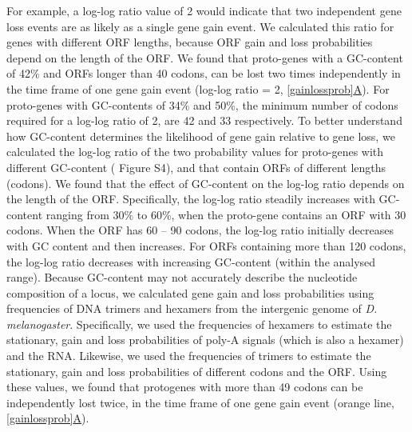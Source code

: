 \documentclass[12pt,a4paper]{article}
\newcommand{\cmnt}[1]{{\color{purple} #1}}
\begin{document}
For example, a log-log ratio value of 2 would indicate that two independent gene loss events are as likely as a single gene gain event. We calculated this ratio for genes with different ORF lengths, because ORF gain and loss probabilities depend on the length of the ORF. We found that proto-genes with a GC-content of 42\% and ORFs longer than 40 codons, can be lost two times independently in the time frame of one gene gain event (log-log ratio = 2, \hyperref[gainlossprob]{\autoref{gainlossprob}A}). For proto-genes with GC-contents of 34\% and 50\%, the minimum number of codons required for a log-log ratio of 2, are 42 and 33 respectively. To better understand how GC-content determines the likelihood of gene gain relative to gene loss, we calculated the log-log ratio of the two probability values for proto-genes with different GC-content ({\color{blue} Figure S4}), and that contain ORFs of different lengths (codons). We found that the effect of GC-content on the log-log ratio depends on the length of the ORF. Specifically, the log-log ratio steadily increases with GC-content ranging from 30\% to 60\%, when the proto-gene contains an ORF with 30 codons. When the ORF has 60 -- 90 codons, the log-log ratio initially decreases with GC content and then increases. For ORFs containing more than 120 codons, the log-log ratio decreases with increasing GC-content (within the analysed range). \cmnt{Because GC-content may not accurately describe the nucleotide composition of a locus, we calculated gene gain and loss probabilities using frequencies of DNA trimers and hexamers from the intergenic genome of \textit{D. melanogaster}. Specifically, we used the frequencies of hexamers to estimate the stationary, gain and loss probabilities of poly-A signals (which is also a hexamer) and the RNA. Likewise, we used the frequencies of trimers to estimate the stationary, gain and loss probabilities of different codons and the ORF. Using these values, we found that protogenes with more than 49 codons can be independently lost twice, in the time frame of one gene gain event (orange line, \hyperref[gainlossprob]{\autoref{gainlossprob}A}).} 
\end{document}
